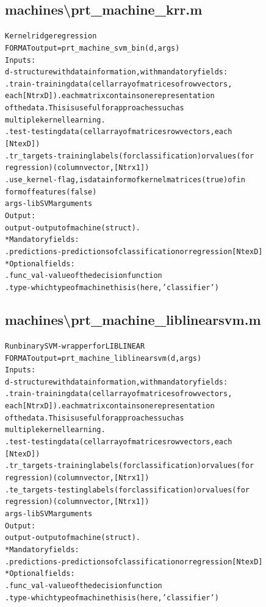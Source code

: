 \subsection{machines\textbackslash prt\_machine\_krr.m}
\begin{alltt}

 Kernel ridge regression
 FORMAT output = prt\_machine\_svm\_bin(d,args)
 Inputs:
   d         - structure with data information, with mandatory fields:
     .train      - training data (cell array of matrices of row vectors,
                   each [Ntr x D]). each matrix contains one representation
                   of the data. This is useful for approaches such as
                   multiple kernel learning.
     .test       - testing data  (cell array of matrices row vectors, each
                   [Nte x D])
     .tr\_targets - training labels (for classification) or values (for
                   regression) (column vector, [Ntr x 1])
     .use\_kernel - flag, is data in form of kernel matrices (true) of in
                form of features (false)
    args     - libSVM arguments
 Output:
    output  - output of machine (struct).
     * Mandatory fields:
      .predictions - predictions of classification or regression [Nte x D]
     * Optional fields:
      .func\_val - value of the decision function
      .type     - which type of machine this is (here, 'classifier')
\end{alltt}


\subsection{machines\textbackslash prt\_machine\_liblinearsvm.m}
\begin{alltt}

 Run binary SVM - wrapper for LIBLINEAR
 FORMAT output = prt\_machine\_liblinearsvm(d,args)
 Inputs:
   d         - structure with data information, with mandatory fields:
     .train      - training data (cell array of matrices of row vectors,
                   each [Ntr x D]). each matrix contains one representation
                   of the data. This is useful for approaches such as
                   multiple kernel learning.
     .test       - testing data  (cell array of matrices row vectors, each
                   [Nte x D])
     .tr\_targets - training labels (for classification) or values (for
                   regression) (column vector, [Ntr x 1])
     .te\_targets - testing labels (for classification) or values (for
                   regression) (column vector, [Ntr x 1])
    args     - libSVM arguments
 Output:
    output  - output of machine (struct).
     * Mandatory fields:
      .predictions - predictions of classification or regression [Nte x D]
     * Optional fields:
      .func\_val - value of the decision function
      .type     - which type of machine this is (here, 'classifier')
\end{alltt}


